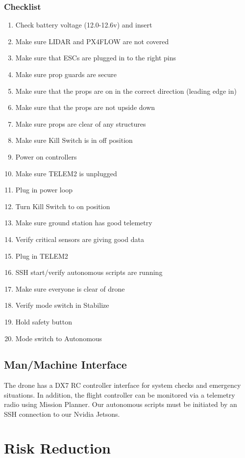 \documentclass[12pt,letterpaper]{article}
\begin{document}
		\subsubsection*{Checklist}
			\begin{enumerate}
				\item Check battery voltage (12.0-12.6v) and insert
				\item Make sure LIDAR and PX4FLOW are not covered
				\item Make sure that ESCs are plugged in to the right pins
				\item Make sure prop guards are secure
				\item Make sure that the props are on in the correct direction (leading edge in)
				\item Make sure that the props are not upside down
				\item Make sure props are clear of any structures
				\item Make sure Kill Switch is in off position
				\item Power on controllers
				\item Make sure TELEM2 is unplugged
				\item Plug in power loop
				\item Turn Kill Switch to on position
				\item Make sure ground station has good telemetry
				\item Verify critical sensors are giving good data
				\item Plug in TELEM2
				\item SSH start/verify autonomous scripts are running
				\item Make sure everyone is clear of drone
				\item Verify mode switch in Stabilize
				\item Hold safety button
				\item Mode switch to Autonomous
			\end{enumerate}
	\subsection*{Man/Machine Interface}
		The drone has a DX7 RC controller interface for system checks and emergency situations. In addition, the flight controller can be monitored via a telemetry radio using Mission Planner. Our autonomous scripts must be initiated by an SSH connection to our Nvidia Jetsons.

\section*{Risk Reduction}
\end{document}
